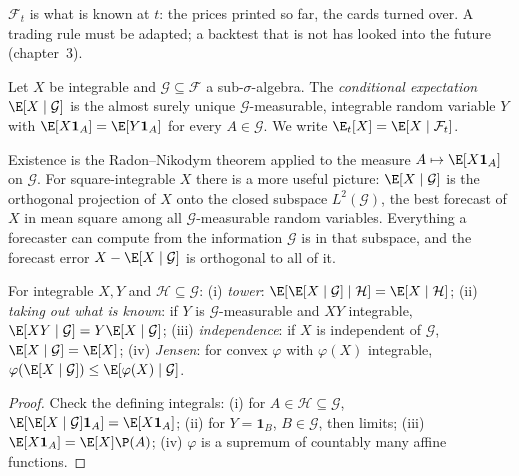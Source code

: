$\mathcal F_t$ is what is known at $t$: the prices printed so far, the cards turned over. A
trading rule must be adapted; a backtest that is not has looked into the future (chapter~3).

\begin{definition}\label{def:qm:probability-at-speed:condexp}
Let $X$ be integrable and $\mathcal G \subseteq \mathcal F$ a sub-$\sigma$-algebra. The
\emph{conditional expectation} $\E[X \mid \mathcal G]$ is
the almost surely unique $\mathcal G$-measurable, integrable random variable $Y$ with
$\E[X\mathbf 1_A] = \E[Y\mathbf 1_A]$ for every $A \in \mathcal G$. We write $\E_t[X] =
\E[X \mid \mathcal F_t]$.
\end{definition}

Existence is the Radon--Nikodym theorem applied to the measure $A \mapsto \E[X\mathbf
1_A]$ on $\mathcal G$. For square-integrable $X$ there is a more useful picture:
$\E[X \mid \mathcal G]$ is the orthogonal projection of $X$ onto the closed subspace
$L^2(\mathcal G)$, the best forecast of $X$ in mean square among all $\mathcal
G$-measurable random variables. Everything a forecaster can compute from the information
$\mathcal G$ is in that subspace, and the forecast error $X - \E[X \mid \mathcal G]$ is
orthogonal to all of it.

\begin{proposition}\label{prop:qm:probability-at-speed:rules}
For integrable $X, Y$ and $\mathcal H \subseteq \mathcal G$:
(i) \emph{tower}: $\E[\E[X \mid \mathcal G] \mid \mathcal H] = \E[X \mid \mathcal H]$;
(ii) \emph{taking out what is known}: if $Y$ is $\mathcal G$-measurable and $XY$ integrable,
$\E[XY \mid \mathcal G] = Y\E[X \mid \mathcal G]$;
(iii) \emph{independence}: if $X$ is independent of $\mathcal G$, $\E[X \mid \mathcal G] =
\E[X]$;
(iv) \emph{Jensen}: for convex $\varphi$ with $\varphi(X)$ integrable, $\varphi(\E[X \mid
\mathcal G]) \le \E[\varphi(X) \mid \mathcal G]$.
\end{proposition}

\begin{proof}
Check the defining integrals: (i) for $A \in \mathcal H \subseteq \mathcal G$, $\E[\E[X \mid
\mathcal G]\mathbf 1_A] = \E[X\mathbf 1_A]$; (ii) for $Y = \mathbf 1_B$, $B \in \mathcal G$,
then limits; (iii) $\E[X\mathbf 1_A] = \E[X]\P(A)$; (iv) $\varphi$ is a supremum of
countably many affine functions.
\end{proof}

